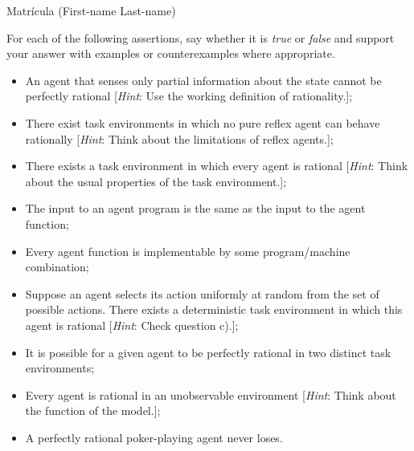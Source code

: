\documentclass[11pt]{article}
\newenvironment{EX}[2][Exercise]{\begin{trivlist}
\item[{\color{red} \hskip \labelsep {\bfseries #1}\hskip \labelsep {\bfseries #2.}}]}{\end{trivlist}}
\newenvironment{SL}[1][Solution]{\begin{trivlist}
\item[{\color{blue} \hskip \labelsep {\bfseries #1:}}]}{\end{trivlist}}
\begin{document}

 \hfill Matr\'icula (First-name Last-name) \\

\begin{EX}{01.01 (part of 02.03 AIMA3)}
For each of the following assertions, say whether it is \textit{true} or \textit{false} and support your answer with examples or counterexamples where appropriate.
\begin{itemize}
\item[a)] An agent that senses only partial information about the state cannot be perfectly rational [\textit{Hint}: Use the working definition of rationality.];
\item[b)] There exist task environments in which no pure reflex agent can behave rationally [\textit{Hint}: Think about the limitations of reflex agents.];
\item[c)] There exists a task environment in which every agent is rational [\textit{Hint}: Think about the usual properties of the task environment.];
\item[d)] The input to an agent program is the same as the input to the agent function;
\item[e)] Every agent function is implementable by some program/machine combination;
\item[f)] Suppose an agent selects its action uniformly at random from the set of possible actions. There exists a deterministic task environment in which this agent is rational [\textit{Hint}: Check question c).];
\item[g)] It is possible for a given agent to be perfectly rational in two distinct task environments;
\item[h)] Every agent is rational in an unobservable environment [\textit{Hint}: Think about the function of the model.];
\item[i)] A perfectly rational poker-playing agent never loses.
\end{itemize}
\end{EX}


\end{document}
